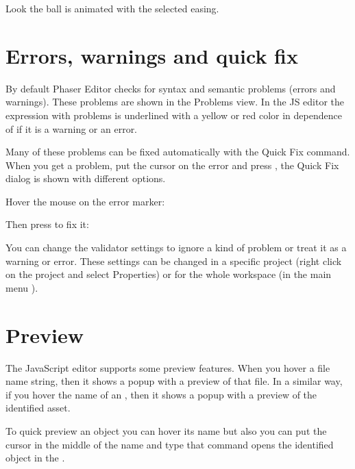 \documentclass[letterpaper,10pt,english]{sphinxmanual}
\begin{document}
\noindent{}

Look the ball is animated with the selected easing.


\section{Errors, warnings and quick fix}
\label{\detokenize{jseditor:errors-warnings-and-quick-fix}}
By default Phaser Editor checks for syntax and semantic problems (errors and warnings). These problems are shown in the Problems view. In the JS editor the expression with problems is underlined with a yellow or red color in dependence of if it is a warning or an error.

Many of these problems can be fixed automatically with the Quick Fix command. When you get a problem, put the cursor on the error and press , the Quick Fix dialog is shown with different options.

Hover the mouse on the error marker:

\noindent{}

Then press  to fix it:

\noindent{}

You can change the validator settings to ignore a kind of problem or treat it as a warning or error. These settings can be changed in a specific project (right click on the project and select Properties) or for the whole workspace (in the main menu ).

\noindent{}


\section{Preview}
\label{\detokenize{jseditor:preview}}
The JavaScript editor supports some preview features. When you hover a file name string, then it shows a popup with a preview of that file. In a similar way, if you hover the name of an  , then it shows a popup with a preview of the identified asset.

To quick preview an object you can hover its name but also you can put the cursor in the middle of the name and type  that command opens the identified object in the .
\end{document}
